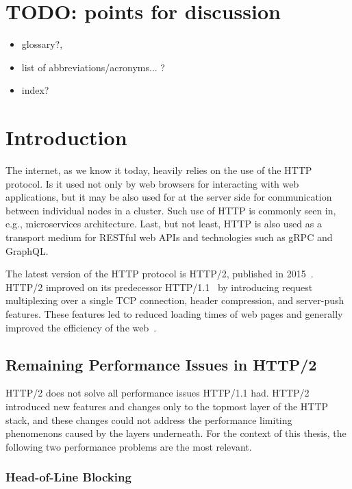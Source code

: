 \chapter*{TODO: points for discussion}

\begin{itemize}

  \item glossary?, 
  \item list of abbreviations/acronyms... ? 
  \item index? 

\end{itemize}

\chapter{Introduction}

The internet, as we know it today, heavily relies on the use of the HTTP protocol. Is it used not
only by web browsers for interacting with web applications, but it may be also used for at the
server side for communication between individual nodes in a cluster. Such use of HTTP is commonly
seen in, e.g., microservices architecture. Last, but not least, HTTP is also used as a transport
medium for RESTful web APIs and technologies such as gRPC and GraphQL.

The latest version of the HTTP protocol is HTTP/2, published in 2015~\cite{rfc7540}. HTTP/2 improved
on its predecessor HTTP/1.1~\cite{rfc7230} by introducing request multiplexing over a single TCP
connection, header compression, and server-push features. These features led to reduced loading
times of web pages and generally improved the efficiency of the web~\cite{deSaxce2015}.

\section{Remaining Performance Issues in HTTP/2}

HTTP/2 does not solve all performance issues HTTP/1.1 had. HTTP/2 introduced new features and
changes only to the topmost layer of the HTTP stack, and these changes could not address the
performance limiting phenomenons caused by the layers underneath. For the context of this thesis,
the following two performance problems are the most relevant.

\subsection*{Head-of-Line Blocking}

